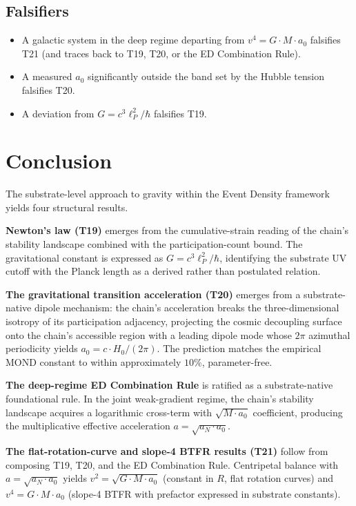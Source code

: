 \documentclass[11pt,a4paper]{article}
\begin{document}
\subsection{Falsifiers}

\begin{itemize}
\item A galactic system in the deep regime departing from $v^4 = G\cdot M \cdot a_0$ falsifies T21 (and traces back to T19, T20, or the ED Combination Rule).
\item A measured $a_0$ significantly outside the band set by the Hubble tension falsifies T20.
\item A deviation from $G = c^3\ell_P^2/\hbar$ falsifies T19.
\end{itemize}

\section{Conclusion}\label{sec:conclusion}

The substrate-level approach to gravity within the Event Density framework yields four structural results.

\textbf{Newton's law (T19)} emerges from the cumulative-strain reading of the chain's stability landscape combined with the participation-count bound. The gravitational constant is expressed as $G = c^3\ell_P^2/\hbar$, identifying the substrate UV cutoff with the Planck length as a derived rather than postulated relation.

\textbf{The gravitational transition acceleration (T20)} emerges from a substrate-native dipole mechanism: the chain's acceleration breaks the three-dimensional isotropy of its participation adjacency, projecting the cosmic decoupling surface onto the chain's accessible region with a leading dipole mode whose $2\pi$ azimuthal periodicity yields $a_0 = c\cdot H_0/(2\pi)$. The prediction matches the empirical MOND constant to within approximately $10\%$, parameter-free.

\textbf{The deep-regime ED Combination Rule} is ratified as a substrate-native foundational rule. In the joint weak-gradient regime, the chain's stability landscape acquires a logarithmic cross-term with $\sqrt{M\cdot a_0}$ coefficient, producing the multiplicative effective acceleration $a = \sqrt{a_N \cdot a_0}$.

\textbf{The flat-rotation-curve and slope-4 BTFR results (T21)} follow from composing T19, T20, and the ED Combination Rule. Centripetal balance with $a = \sqrt{a_N \cdot a_0}$ yields $v^2 = \sqrt{G\cdot M \cdot a_0}$ (constant in $R$, flat rotation curves) and $v^4 = G\cdot M \cdot a_0$ (slope-4 BTFR with prefactor expressed in substrate constants).
\end{document}
